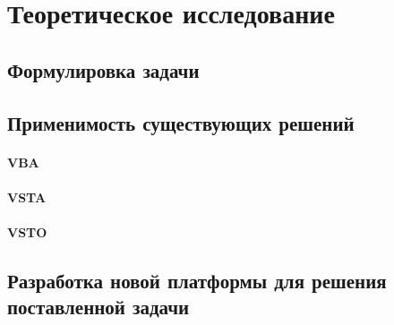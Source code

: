 \section{Теоретическое исследование}




\subsection{Формулировка задачи}
\subsection{Применимость существующих решений}
\paragraph{VBA}
\paragraph{VSTA}
\paragraph{VSTO}
\subsection{Разработка новой платформы для решения поставленной задачи}

\pagebreak